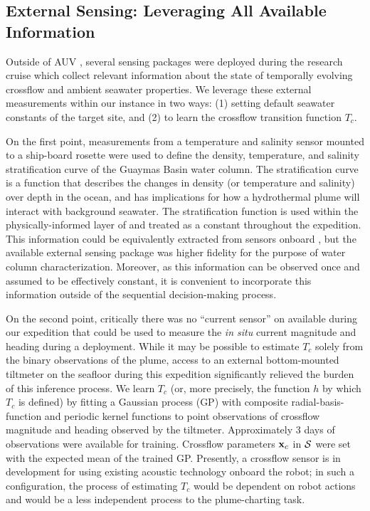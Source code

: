 \subsection{External Sensing: Leveraging All Available Information}
\label{sec:external_current}
Outside of AUV \Sentry, several sensing packages were deployed during the research cruise which collect relevant information about the state of temporally evolving crossflow and ambient seawater properties. We leverage these external measurements within our \PHUMES instance in two ways: (1) setting default seawater constants of the target site, and (2) to learn the crossflow transition function $T_c$.

On the first point, measurements from a temperature and salinity sensor mounted to a ship-board rosette were used to define the density, temperature, and salinity stratification curve of the Guaymas Basin water column. The stratification curve is a function that describes the changes in density (or temperature and salinity) over depth in the ocean, and has implications for how a hydrothermal plume will interact with background seawater. The stratification function is used within the physically-informed layer of \PHUMES and treated as a constant throughout the expedition. This information could be equivalently extracted from sensors onboard \Sentry, but the available external sensing package was higher fidelity for the purpose of water column characterization. Moreover, as this information can be observed once and assumed to be effectively constant, it is convenient to incorporate this information outside of the sequential decision-making process.

On the second point, critically there was no ``current sensor'' on \Sentry available during our expedition that could be used to measure the \emph{in situ} current magnitude and heading during a deployment. While it may be possible to estimate $T_c$ solely from the binary observations of the plume, access to an external bottom-mounted tiltmeter on the seafloor during this expedition significantly relieved the burden of this inference process. We learn $T_c$ (or, more precisely, the function $h$ by which $T_c$ is defined) by fitting a Gaussian process (GP) with composite radial-basis-function and periodic kernel functions to point observations of crossflow magnitude and heading observed by the tiltmeter. Approximately 3 days of observations were available for training. Crossflow parameters $\mathbf{x}_c$ in $\mathcal{S}$ were set with the expected mean of the trained GP. Presently, a crossflow sensor is in development for \Sentry using existing acoustic technology onboard the robot; in such a configuration, the process of estimating $T_c$ would be dependent on robot actions and would be a less independent process to the plume-charting task.

